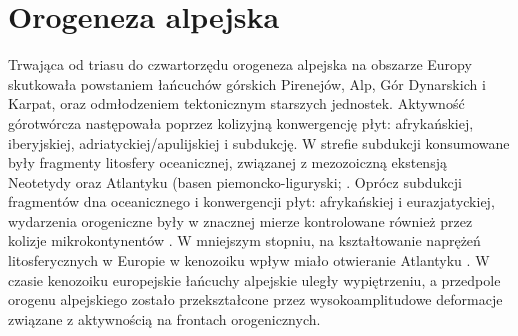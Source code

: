 \documentclass[11.5pt,twoside]{report}
\begin{document}
 

	
	
	
	\section{Orogeneza alpejska}
	
Trwająca od triasu do czwartorzędu orogeneza alpejska na obszarze Europy skutkowała powstaniem łańcuchów górskich Pirenejów, Alp, Gór Dynarskich i Karpat, oraz odmłodzeniem tektonicznym starszych jednostek. Aktywność górotwórcza następowała poprzez kolizyjną konwergencję płyt: afrykańskiej, iberyjskiej, adriatyckiej/apulijskiej \parencite{Sissingh.2006a} i subdukcję. W strefie subdukcji konsumowane były fragmenty litosfery oceanicznej, związanej z mezozoiczną ekstensją Neotetydy oraz Atlantyku (basen piemoncko-liguryski; \cite{Advokaat.2014}. Oprócz subdukcji fragmentów dna oceanicznego i konwergencji płyt: afrykańskiej i eurazjatyckiej, wydarzenia orogeniczne były w znacznej mierze kontrolowane również przez kolizje mikrokontynentów \parencite{Advokaat.2014,Dewey.1989}. W mniejszym stopniu, na kształtowanie naprężeń litosferycznych w Europie w kenozoiku wpływ miało otwieranie Atlantyku \parencite{Sissingh.2006a}. W czasie kenozoiku europejskie łańcuchy alpejskie uległy wypiętrzeniu, a przedpole orogenu alpejskiego zostało przekształcone przez wysokoamplitudowe deformacje związane z aktywnością na frontach orogenicznych.
\end{document}
